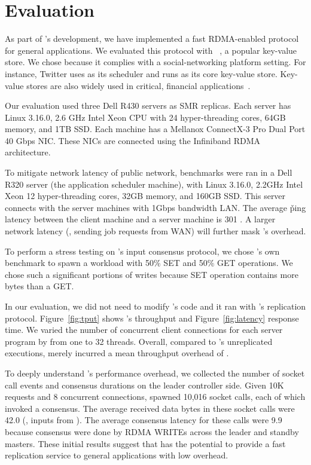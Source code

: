 \section{Evaluation} \label{sec:eval}

As part of \xxx's development, we have implemented a fast RDMA-enabled \paxos 
protocol~\cite{falcon:github} for general applications. We evaluated this 
protocol with \redis~\cite{redis}, a popular key-value store. We chose \redis 
because it complies with a social-networking platform setting. For instance, 
Twitter uses \mesos as its scheduler and runs \redis as its core key-value 
store. Key-value stores are also widely used 
in critical, financial applications~\cite{nosql:finance,nosql:eval}.

Our evaluation used three Dell R430 servers as SMR replicas. Each server has 
Linux 3.16.0, 2.6 GHz Intel Xeon CPU with 24 hyper-threading cores, 64GB 
memory, and 1TB SSD. Each machine has a Mellanox ConnectX-3 Pro Dual Port 40 
Gbps NIC. These NICs are connected using the Infiniband RDMA architecture.

To mitigate network latency of public network, benchmarks were ran 
in a Dell R320 server (the application scheduler machine), with Linux 3.16.0, 
2.2GHz Intel Xeon 12 hyper-threading cores, 32GB memory, and 160GB SSD. This 
server connects with the server machines with 1Gbps bandwidth LAN. The average 
\v{ping} latency between the client machine and a server machine is 301 \us. A 
larger network latency (\eg, sending job requests from WAN) will further 
mask \xxx's overhead.

To perform a stress testing on \xxx's input consensus protocol, we chose 
\redis's own benchmark to spawn a workload with 50\% SET and 50\% GET 
operations. We chose such a significant portions of writes because SET 
operation contains more bytes than a GET.

In our evaluation, we did not need to modify \redis's code and it ran with 
\xxx's replication protocol. Figure~\ref{fig:tput} shows \xxx's throughput and 
Figure~\ref{fig:latency} response time. We varied the number of concurrent 
client connections for each server program by from one to 32 threads. Overall, 
compared to \redis's unreplicated executions, \xxx merely incurred a mean 
throughput overhead of \tputoverhead. 

To deeply understand \xxx's performance overhead, we collected the number of 
socket call events and consensus durations on the leader controller side. Given 
10K requests and 8 concurrent connections, \redis spawned 10,016 socket calls, 
each of which invoked a \paxos consensus. The average received data bytes in 
these socket calls were 42.0 (\eg, inputs from \recv). The average consensus 
latency for these calls were 9.9 \us because consensus were done by RDMA WRITEs 
across the leader and standby masters. These initial results suggest that \xxx 
has the potential to provide a fast \paxos replication service to general 
applications with low overhead. 

